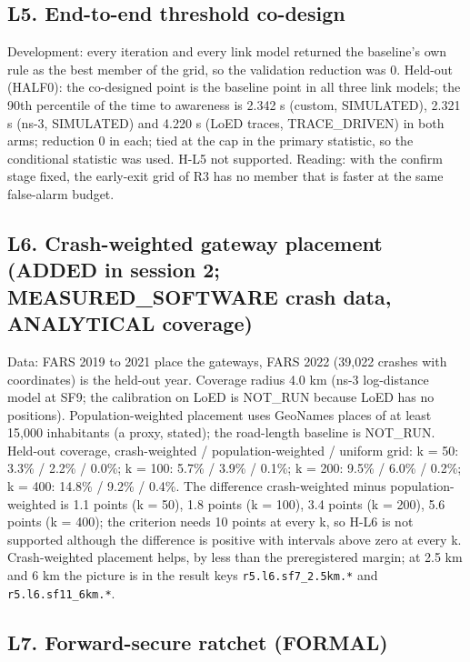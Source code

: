 \subsection*{L5. End-to-end threshold co-design}

Development: every iteration and every link model returned the baseline's own rule as the best member of the grid, so the validation reduction was 0. Held-out (HALF0): the co-designed point is the baseline point in all three link models; the 90th percentile of the time to awareness is 2.342 s (custom, SIMULATED), 2.321 s (ns-3, SIMULATED) and 4.220 s (LoED traces, TRACE\_DRIVEN) in both arms; reduction 0 in each; tied at the cap in the primary statistic, so the conditional statistic was used. H-L5 not supported. Reading: with the confirm stage fixed, the early-exit grid of R3 has no member that is faster at the same false-alarm budget.

\subsection*{L6. Crash-weighted gateway placement (ADDED in session 2; MEASURED\_SOFTWARE crash data, ANALYTICAL coverage)}

Data: FARS 2019 to 2021 place the gateways, FARS 2022 (39,022 crashes with coordinates) is the held-out year. Coverage radius 4.0 km (ns-3 log-distance model at SF9; the calibration on LoED is NOT\_RUN because LoED has no positions). Population-weighted placement uses GeoNames places of at least 15,000 inhabitants (a proxy, stated); the road-length baseline is NOT\_RUN. Held-out coverage, crash-weighted / population-weighted / uniform grid: k = 50: 3.3\% / 2.2\% / 0.0\%; k = 100: 5.7\% / 3.9\% / 0.1\%; k = 200: 9.5\% / 6.0\% / 0.2\%; k = 400: 14.8\% / 9.2\% / 0.4\%. The difference crash-weighted minus population-weighted is 1.1 points (k = 50), 1.8 points (k = 100), 3.4 points (k = 200), 5.6 points (k = 400); the criterion needs 10 points at every k, so H-L6 is not supported although the difference is positive with intervals above zero at every k. Crash-weighted placement helps, by less than the preregistered margin; at 2.5 km and 6 km the picture is in the result keys \texttt{r5.l6.sf7\_2.5km.*} and \texttt{r5.l6.sf11\_6km.*}.

\subsection*{L7. Forward-secure ratchet (FORMAL)}


